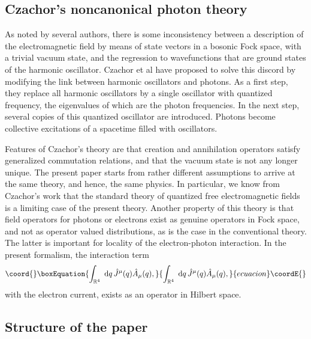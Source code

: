 \documentclass[12pt,a4paper]{article}
\def\Ro{{\mathbb R}}
\begin{document}
\subsection {Czachor's noncanonical photon theory}


As noted by 
several authors, there is some inconsistency between a 
description of the electromagnetic field by means of state 
vectors in a bosonic Fock space, with a trivial vacuum state, and 
the regression to wavefunctions that are ground states of the 
harmonic oscillator. Czachor et al \cite {CM00,CS01,CM02} have proposed to solve 
this discord by modifying the link between harmonic oscillators 
and photons. As a first step, they replace all harmonic 
oscillators by a single oscillator with quantized frequency, the 
eigenvalues of which are the photon frequencies. In the next 
step, several copies of this quantized oscillator are introduced.
Photons become collective excitations of a spacetime filled 
with oscillators.

Features of Czachor's theory are that creation and annihilation
operators satisfy generalized commutation relations, and
that the vacuum state is not any longer unique.
The present paper starts from rather different assumptions
to arrive at the same theory, and hence,
the same physics.
In particular, we know from Czachor's work that
the standard theory of quantized free
electromagnetic fields is a limiting case of the present theory.
Another property of this theory is that field operators
\coordHE{} for photons or electrons exist as genuine
operators in Fock space, and not as operator valued distributions,
as is the case in the conventional theory.
The latter is important for locality of
the electron-photon interaction. In the present formalism, the interaction term
\begin{equation}\coord{}\boxEquation{
\int_{\Ro^4}\hbox{ d}q\,\hat J^\mu(q) \hat A_\mu(q),
}{
\int_{\Ro^4}\hbox{ d}q\,\hat J^\mu(q) \hat A_\mu(q),
}{ecuacion}\coordE{}\end{equation}
with \coordHE{} the electron current,
exists as an operator in Hilbert space.


\subsection{Structure of the paper}
\end{document}
